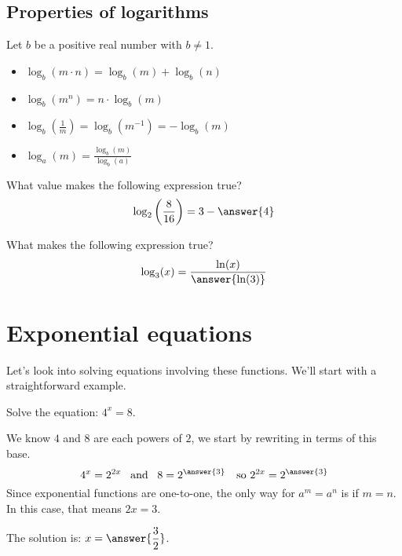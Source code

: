 \documentclass{ximera}
\begin{document}
\subsection{Properties of logarithms}
Let $b$ be a positive real number with $b\ne 1$.
\begin{itemize}
\item $\log_b(m\cdot n) = \log_b(m) + \log_b(n)$
\item $\log_b(m^n) = n\cdot \log_b(m)$
\item $\log_b\left(\frac{1}{m}\right) = \log_b(m^{-1}) = -\log_b(m)$
\item $\log_a(m) = \frac{\log_b(m)}{\log_b(a)}$
\end{itemize}

\begin{question}
  What value makes the following expression true?
  \[
  \log_2\left(\frac{8}{16}\right) = 3-\answer{4}
  \]
\end{question}


\begin{question}
  What makes the following expression true?
  \[
  \log_3(x) = \frac{\ln(x)}{\answer{\ln(3)}}
  \]
\end{question}


\section{Exponential equations}
Let's look into solving equations involving these functions.  We'll start with a straightforward example.
\begin{example}
	Solve the equation: $\displaystyle 4^x = 8$.
	\begin{explanation}
		We know $4$ and $8$ are each powers of $2$, we start by rewriting in terms of this base.
		\[ 4^x = 2^{2x}  \,\,\, \textrm{ and } \,\,\, 8 =2^{\answer{3}} \,\,\,\, \textrm{ so } 2^{2x} = 2^{\answer{3}} \]
		Since exponential functions are one-to-one, the only way for $a^m = a^n$ is if $m=n$.  In this case,
		that means $\displaystyle 2x = 3$.
		
		The solution is: $\displaystyle x = \answer{\dfrac{3}{2}}$.
	\end{explanation}
\end{example}
\end{document}

